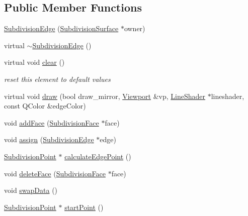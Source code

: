 \subsection*{Public Member Functions}
\begin{DoxyCompactItemize}
\item 
\hyperlink{classShipCADGeometry_1_1SubdivisionEdge_ab08271ed7f5d371f0495d8a7d2c96dae}{Subdivision\-Edge} (\hyperlink{classShipCADGeometry_1_1SubdivisionSurface}{Subdivision\-Surface} $\ast$owner)
\item 
virtual \hyperlink{classShipCADGeometry_1_1SubdivisionEdge_ac787ad1a0228f91038de9518ad217364}{$\sim$\-Subdivision\-Edge} ()
\item 
virtual void \hyperlink{classShipCADGeometry_1_1SubdivisionEdge_a08358ac65c2d710855b8b93c64ce9d02}{clear} ()
\begin{DoxyCompactList}\small\item\em reset this element to default values \end{DoxyCompactList}\item 
virtual void \hyperlink{classShipCADGeometry_1_1SubdivisionEdge_a26deda12672fa679b49b28f2371e728b}{draw} (bool draw\-\_\-mirror, \hyperlink{classShipCADGeometry_1_1Viewport}{Viewport} \&vp, \hyperlink{classShipCADGeometry_1_1LineShader}{Line\-Shader} $\ast$lineshader, const Q\-Color \&edge\-Color)
\item 
void \hyperlink{classShipCADGeometry_1_1SubdivisionEdge_a1b2e2b1d7e051d42250c0ad1f5eaa560}{add\-Face} (\hyperlink{classShipCADGeometry_1_1SubdivisionFace}{Subdivision\-Face} $\ast$face)
\item 
void \hyperlink{classShipCADGeometry_1_1SubdivisionEdge_ab91ca7bbcd013cc01e90b077ea1aae9b}{assign} (\hyperlink{classShipCADGeometry_1_1SubdivisionEdge}{Subdivision\-Edge} $\ast$edge)
\item 
\hyperlink{classShipCADGeometry_1_1SubdivisionPoint}{Subdivision\-Point} $\ast$ \hyperlink{classShipCADGeometry_1_1SubdivisionEdge_aa1bce1c13f4911839205e812cfd0f683}{calculate\-Edge\-Point} ()
\item 
void \hyperlink{classShipCADGeometry_1_1SubdivisionEdge_a1f4b70ab6d0c4dfec07a2d4348bc9a3e}{delete\-Face} (\hyperlink{classShipCADGeometry_1_1SubdivisionFace}{Subdivision\-Face} $\ast$face)
\item 
void \hyperlink{classShipCADGeometry_1_1SubdivisionEdge_ad19ddea08367fa2307e131132e36c008}{swap\-Data} ()
\item 
\hyperlink{classShipCADGeometry_1_1SubdivisionPoint}{Subdivision\-Point} $\ast$ \hyperlink{classShipCADGeometry_1_1SubdivisionEdge_a0d8b0bc79b1f8d19f2c4798251aeff31}{start\-Point} ()

\end{DoxyCompactItemize}
